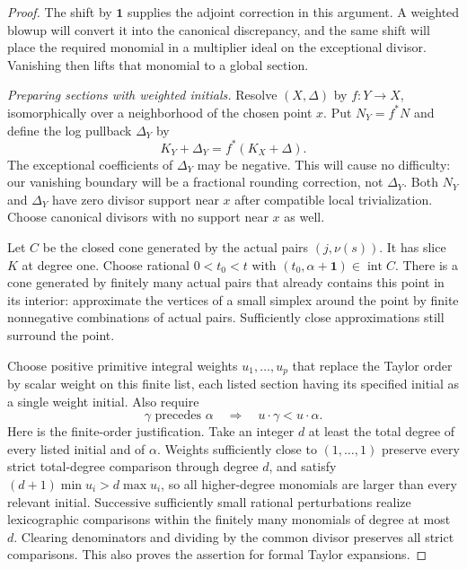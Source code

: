 \begin{proof}
The shift by $\mathbf1$ supplies the adjoint correction in this
argument.  A weighted blowup will convert it into the canonical
discrepancy, and the same shift will place the required monomial in a
multiplier ideal on the exceptional divisor.  Vanishing then lifts
that monomial to a global section.

\medskip
\noindent\emph{Preparing sections with weighted initials.}
Resolve $(X,\Delta)$ by $f:Y\to X$, isomorphically over a neighborhood
of the chosen point $x$.  Put $N_Y=f^*N$ and define the log pullback
$\Delta_Y$ by
\[
 K_Y+\Delta_Y=f^*(K_X+\Delta).
\]
The exceptional coefficients of $\Delta_Y$ may be negative.  This
will cause no difficulty: our vanishing boundary will be a fractional
rounding correction, not $\Delta_Y$.  Both $N_Y$ and $\Delta_Y$ have
zero divisor support near $x$ after compatible local trivialization.
Choose canonical divisors with no support near $x$ as well.

Let $C$ be the closed cone generated by the actual pairs $(j,\nu(s))$.
It has slice $K$ at degree one.  Choose rational $0<t_0<t$ with
$(t_0,\alpha+\mathbf1)\in\operatorname{int}C$.  There is a cone
generated by finitely many actual pairs that already contains this
point in its interior: approximate the vertices of a small simplex
around the point by finite nonnegative combinations of actual pairs.
Sufficiently close approximations still surround the point.

Choose positive primitive integral weights $u_1,\ldots,u_p$ that
replace the Taylor order by scalar weight on this finite list, each
listed section having its specified initial as a single weight initial.
Also require
\[
 \gamma\text{ precedes }\alpha\quad\Longrightarrow\quad
        u\cdot\gamma<u\cdot\alpha.
\]
Here is the finite-order justification.  Take an integer $d$ at least
the total degree of every listed initial and of $\alpha$.  Weights
sufficiently close to $(1,\ldots,1)$ preserve every strict total-degree
comparison through degree $d$, and satisfy
$(d+1)\min u_i>d\max u_i$, so all higher-degree monomials are larger
than every relevant initial.  Successive sufficiently small rational
perturbations realize lexicographic comparisons within the finitely
many monomials of degree at most $d$.  Clearing denominators and
dividing by the common divisor preserves all strict comparisons.
This also proves the assertion for formal Taylor expansions.


\end{proof}
